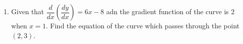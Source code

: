 \documentclass{report}
\newcommand{\sol}{\textbf{Solution:}}
\begin{document}
\begin{enumerate}[leftmargin=*]
\begin{enumerate}
              \item the distance, in km, between town $A$ and town $B$.

                    \sol{}
                    \begin{align*}
                        \text{Distance} & = |AB|                    \\
                                        & = \sqrt{(16)^2 + (-17)^2} \\
                                        & = \sqrt{256 + 289}        \\
                                        & = \sqrt{545}              \\
                                        & \approx 23.52 \text{ km}
                    \end{align*}

              \item $\overrightarrow{OC}$

                    \sol{}
                    \begin{align*}
                        \overrightarrow{AC} & = 2\overrightarrow{AB}                                               \\
                                            & = 2(16\vec{\imath} - 17\vec{\jmath})                                 \\
                                            & = 32\vec{\imath} - 34\vec{\jmath}                                    \\
                        \overrightarrow{AC} & = \overrightarrow{OC} - \overrightarrow{OA}                          \\
                        \overrightarrow{OC} & = \overrightarrow{AC} + \overrightarrow{OA}                          \\
                                            & = 32\vec{\imath} - 34\vec{\jmath} + (-8\vec{\imath} + 8\vec{\jmath}) \\
                                            & = 24\vec{\imath} - 26\vec{\jmath}
                    \end{align*}
          \end{enumerate}

          \newpage
    \item Given that $\dfrac{d}{dx}\left(\dfrac{dy}{dx}\right) = 6x - 8$ adn the gradient
          function of the curve is 2 when $x = 1$. Find the equation of the curve which
          passes through the point $(2, 3)$.


\end{enumerate}
\end{document}
